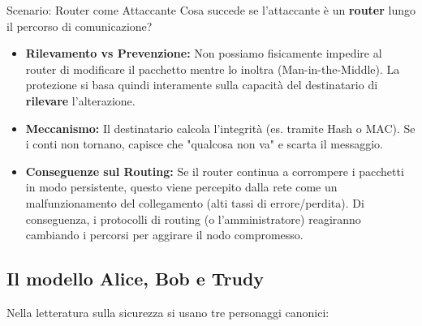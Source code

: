 \documentclass[a4paper,12pt]{report}
\begin{document}
\begin{notebox}{Scenario: Router come Attaccante}
Cosa succede se l'attaccante è un \textbf{router} lungo il percorso di comunicazione?
\begin{itemize}
    \item \textbf{Rilevamento vs Prevenzione:} Non possiamo fisicamente impedire al router di modificare il pacchetto mentre lo inoltra (Man-in-the-Middle). La protezione si basa quindi interamente sulla capacità del destinatario di \textbf{rilevare} l'alterazione.
    \item \textbf{Meccanismo:} Il destinatario calcola l'integrità (es. tramite Hash o MAC). Se i conti non tornano, capisce che "qualcosa non va" e scarta il messaggio.
    \item \textbf{Conseguenze sul Routing:} Se il router continua a corrompere i pacchetti in modo persistente, questo viene percepito dalla rete come un malfunzionamento del collegamento (alti tassi di errore/perdita). Di conseguenza, i protocolli di routing (o l'amministratore) reagiranno cambiando i percorsi per aggirare il nodo compromesso.
\end{itemize}
\end{notebox}


\subsection{Il modello Alice, Bob e Trudy}

Nella letteratura sulla sicurezza si usano tre personaggi canonici:

\begin{center}
\end{center}
\end{document}

